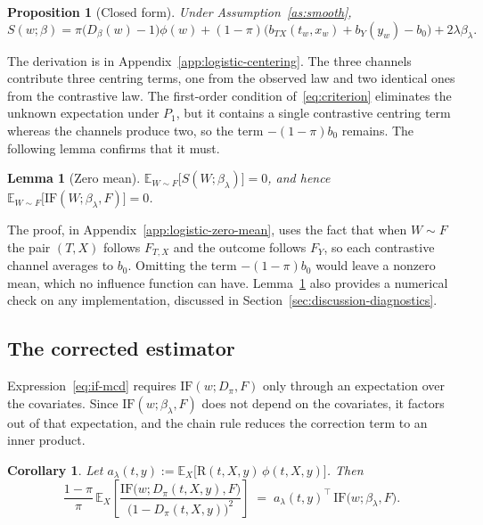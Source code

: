 \documentclass[11pt]{article}
\theoremstyle{plain}
\newtheorem{mypropo}{Proposition}
\newtheorem{lem}{Lemma}
\newtheorem{corollary}{Corollary}
\theoremstyle{definition}
\theoremstyle{remark}
\newcommand{\pE}{\ensuremath{\mathbb{E}}}
\newcommand{\ratio}{\ensuremath{\pi}}
\newcommand{\contrast}{D_{\ratio}}
\newcommand{\DensityRatio}{\text{R}}
\newcommand{\IF}{\mathrm{IF}}
\newcommand{\score}{S}
\begin{document}
\begin{mypropo}[Closed form]
\label{prop:closed-form}
Under Assumption~\ref{as:smooth},
\begin{equation}
\score(w;\beta)
= \ratio\big( D_\beta(w) - 1 \big)\phi(w)
+ (1-\ratio)\Big( b_{TX}(t_w,x_w) + b_Y(y_w) - b_0 \Big)
+ 2\lambda\beta_\lambda .
\label{eq:S}
\end{equation}
\end{mypropo}

The derivation is in Appendix~\ref{app:logistic-centering}. The three channels contribute
three centring terms, one from the observed law and two identical ones from the
contrastive law. The first-order condition of~\eqref{eq:criterion} eliminates the
unknown expectation under $P_1$, but it contains a single contrastive centring term
whereas the channels produce two, so the term $-(1-\ratio)b_0$ remains. The following
lemma confirms that it must.

\begin{lem}[Zero mean]
\label{lem:zero-mean}
$\pE_{W \sim F}\big[\score(W;\beta_\lambda)\big] = 0$, and hence
$\pE_{W \sim F}\big[\IF(W;\beta_\lambda,F)\big] = 0$.
\end{lem}

The proof, in Appendix~\ref{app:logistic-zero-mean}, uses the fact that when $W \sim F$
the pair $(T,X)$ follows $F_{T,X}$ and the outcome follows $F_Y$, so each contrastive
channel averages to $b_0$. Omitting the term $-(1-\ratio)b_0$ would leave a nonzero mean,
which no influence function can have. Lemma~\ref{lem:zero-mean} also provides a numerical
check on any implementation, discussed in Section~\ref{sec:discussion-diagnostics}.

\subsection{The corrected estimator}
\label{sec:mcd-estimator}

Expression~\eqref{eq:if-mcd} requires $\IF(w;\contrast,F)$ only through an expectation
over the covariates. Since $\IF(w;\beta_\lambda,F)$ does not depend on the covariates, it
factors out of that expectation, and the chain rule reduces the correction term to an
inner product.

\begin{corollary}
\label{cor:collapse}
Let $a_\lambda(t,y) := \pE_X\big[ \DensityRatio(t,X,y)\,\phi(t,X,y) \big]$. Then
\begin{equation}
\frac{1-\ratio}{\ratio}\,
\pE_X\!\left[ \frac{\IF\big(w;\contrast(t,X,y),F\big)}{\big(1-\contrast(t,X,y)\big)^{2}} \right]
\;=\; a_\lambda(t,y)^\top\, \IF\big(w;\beta_\lambda,F\big).
\label{eq:collapse}
\end{equation}
\end{corollary}
\end{document}
